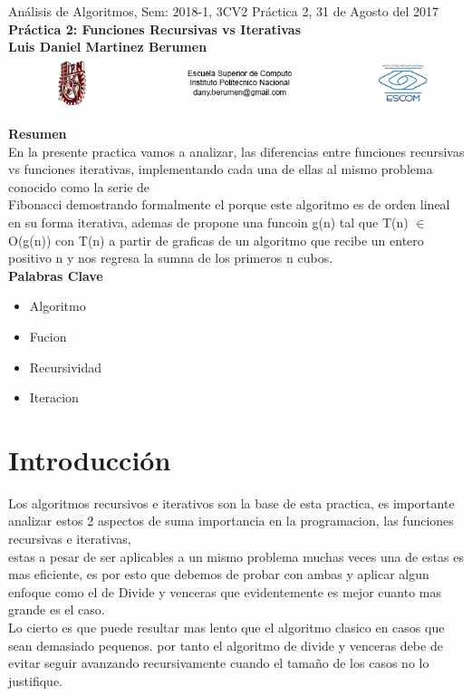 \documentclass[spanish]{article}
\begin{document}
	\setmarginsrb{30mm}{30mm}{30mm}{30mm}{0pt}{0mm}{0pt}{0mm}
	
	\begin{center}
	{\Large Análisis de Algoritmos, Sem: 2018-1, 3CV2 Práctica 2, 31 de Agosto del 2017}\\
	{\huge {\bf Práctica 2: Funciones Recursivas vs Iterativas}} \\
	{\large {\bf Luis Daniel Martinez Berumen}}\\
	\includegraphics[width=1\textwidth]{./imagenes/logos.png}\\
	\end{center}
\bigskip\bigskip\bigskip
	{\Large {\bf Resumen}}\\
	En la presente practica vamos a analizar, las diferencias entre funciones recursivas vs funciones iterativas, implementando cada una de ellas al mismo problema conocido como la serie de\\ 
	Fibonacci demostrando formalmente el porque este algoritmo es de orden lineal en su forma iterativa, ademas de propone una funcoin g(n) tal que T(n) $\in$ O(g(n)) con T(n) a partir de graficas de un algoritmo que recibe un entero positivo n y nos regresa la sumna de los 		primeros n cubos.
\bigskip\bigskip
	{\Large {\bf \\  Palabras Clave}}
	\begin{itemize}
		\item Algoritmo
		\item Fucion
		\item Recursividad
		\item Iteracion
	\end{itemize}
	\bigskip
	\section{Introducci\'on}
	Los algoritmos recursivos e iterativos son la base de esta practica, es importante analizar estos 2 aspectos de suma importancia en la programacion, las funciones recursivas e iterativas, \\ estas a pesar de ser aplicables a un mismo problema
	muchas veces una de estas es mas eficiente, es por esto que debemos de probar con ambas y aplicar algun enfoque como el de Divide y venceras que evidentemente es mejor 
	cuanto mas grande es el caso. \\ Lo cierto es que puede resultar mas lento que el algoritmo clasico en casos que sean demasiado pequenos. por tanto el algoritmo de divide y venceras
	debe de evitar seguir avanzando recursivamente cuando el tamaño de los casos no lo justifique.
	\bigskip
\newpage
\end{document}
